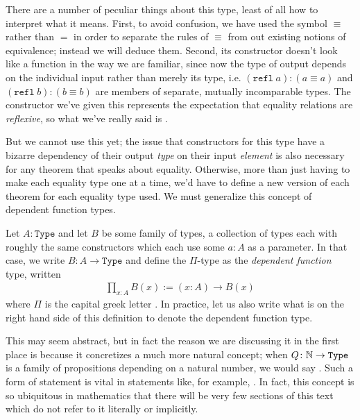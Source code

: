 \documentclass[11pt]{article}
\begin{document}
There are a number of peculiar things about this type, least of all how to interpret what it means. First, to avoid confusion, we have used the symbol $\equiv$ rather than $=$ in order to separate the rules of $\equiv$ from out existing notions of equivalence; instead we will deduce them. Second, its constructor doesn't look like a function in the way we are familiar, since now the type of output depends on the individual input rather than merely its type, i.e. $(\mathtt{refl} \hspace{3pt} a) \colon (a \equiv a)$ and $(\mathtt{refl} \hspace{3pt} b) \colon (b \equiv b)$ are members of separate, mutually incomparable types. The constructor we've given this represents the expectation that equality relations are \emph{reflexive}, so what we've really said is .

But we cannot use this yet; the issue that constructors for this type have a bizarre dependency of their output \emph{type} on their input \emph{element} is also necessary for any theorem that speaks about equality. Otherwise, more than just having to make each equality type one at a time, we'd have to define a new version of each theorem for each equality type used. We must generalize this concept of dependent function types.

\begin{definition}
Let $A \colon \mathtt{Type}$ and let $B$ be some family of types, a collection of types each with roughly the same constructors which each use some $a \colon A$ as a parameter. In that case, we write $B \colon A \to \mathtt{Type}$ and define the $\Pi$-type as the \emph{dependent function} type, written \begin{gather*}
\prod_{x : A} B(x) := (x \colon A) \to B(x)
\end{gather*}
where $\Pi$ is the capital greek letter . In practice, let us also write what is on the right hand side of this definition to denote the dependent function type.
\end{definition}

This may seem abstract, but in fact the reason we are discussing it in the first place is because it concretizes a much more natural concept; when $Q \colon \mathbb{N} \to \mathtt{Type}$ is a family of propositions depending on a natural number, we would say . Such a form of statement is vital in statements like, for example, . In fact, this concept is so ubiquitous in mathematics that there will be very few sections of this text which do not refer to it literally or implicitly.
\end{document}
